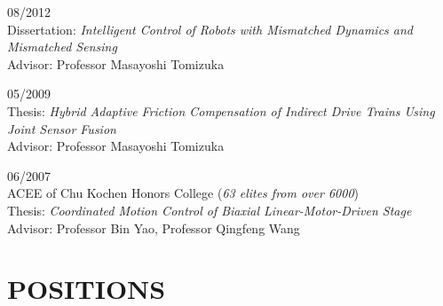\documentclass[UTF8,fontset=none]{res}
\begin{document}
\begin{resume}
       \hfill 08/2012\\
    Dissertation: {\it Intelligent Control of Robots with Mismatched Dynamics and Mismatched Sensing}\\
    Advisor: Professor Masayoshi Tomizuka

       \hfill 05/2009\\
    Thesis: {\it Hybrid Adaptive Friction Compensation of Indirect Drive Trains Using Joint Sensor Fusion}\\
    Advisor: Professor Masayoshi Tomizuka

       \hfill 06/2007\\
     \hfill ACEE of Chu Kochen Honors College (\emph{63 elites from over 6000})\\
    Thesis: {\it Coordinated Motion Control of Biaxial Linear-Motor-Driven Stage}\\
    Advisor: Professor Bin Yao, Professor Qingfeng Wang


\section{POSITIONS}
\vspace{0.1in}
\begin{list}{}{\setlength\leftmargin{0in}\setlength\topsep{0.15in}}


\end{list}
\end{resume}
\end{document}

